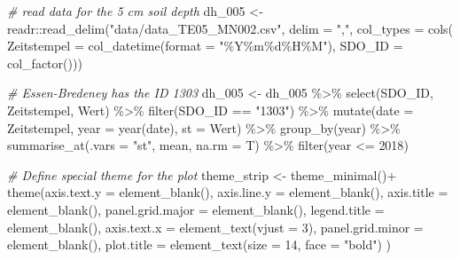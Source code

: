\documentclass[
]{article}
\newenvironment{Shaded}{\begin{snugshade}}{\end{snugshade}}
\newcommand{\AttributeTok}[1]{\textcolor[rgb]{0.77,0.63,0.00}{#1}}
\newcommand{\CommentTok}[1]{\textcolor[rgb]{0.56,0.35,0.01}{\textit{#1}}}
\newcommand{\DecValTok}[1]{\textcolor[rgb]{0.00,0.00,0.81}{#1}}
\newcommand{\FunctionTok}[1]{\textcolor[rgb]{0.00,0.00,0.00}{#1}}
\newcommand{\NormalTok}[1]{#1}
\newcommand{\OtherTok}[1]{\textcolor[rgb]{0.56,0.35,0.01}{#1}}
\newcommand{\SpecialCharTok}[1]{\textcolor[rgb]{0.00,0.00,0.00}{#1}}
\newcommand{\StringTok}[1]{\textcolor[rgb]{0.31,0.60,0.02}{#1}}
\begin{document}
\begin{Shaded}
\begin{Highlighting}[]
\CommentTok{\# read data for the 5 cm soil depth}
\NormalTok{dh\_005 }\OtherTok{\textless{}{-}}\NormalTok{ readr}\SpecialCharTok{::}\FunctionTok{read\_delim}\NormalTok{(}\StringTok{"data/data\_TE05\_MN002.csv"}\NormalTok{,}
                        \AttributeTok{delim =} \StringTok{","}\NormalTok{, }
                        \AttributeTok{col\_types =} \FunctionTok{cols}\NormalTok{(}
                          \AttributeTok{Zeitstempel =} \FunctionTok{col\_datetime}\NormalTok{(}\AttributeTok{format =} \StringTok{"\%Y\%m\%d\%H\%M"}\NormalTok{),}
                          \AttributeTok{SDO\_ID =} \FunctionTok{col\_factor}\NormalTok{()))}

\CommentTok{\# Essen{-}Bredeney has the ID 1303}
\NormalTok{dh\_005 }\OtherTok{\textless{}{-}}\NormalTok{ dh\_005 }\SpecialCharTok{\%\textgreater{}\%}
  \FunctionTok{select}\NormalTok{(SDO\_ID, Zeitstempel, Wert) }\SpecialCharTok{\%\textgreater{}\%}
  \FunctionTok{filter}\NormalTok{(SDO\_ID }\SpecialCharTok{==} \StringTok{"1303"}\NormalTok{) }\SpecialCharTok{\%\textgreater{}\%}
  \FunctionTok{mutate}\NormalTok{(}\AttributeTok{date =}\NormalTok{ Zeitstempel, }
         \AttributeTok{year =} \FunctionTok{year}\NormalTok{(date), }
         \AttributeTok{st =}\NormalTok{ Wert) }\SpecialCharTok{\%\textgreater{}\%}
  \FunctionTok{group\_by}\NormalTok{(year) }\SpecialCharTok{\%\textgreater{}\%}
  \FunctionTok{summarise\_at}\NormalTok{(}\AttributeTok{.vars =} \StringTok{"st"}\NormalTok{, mean, }\AttributeTok{na.rm =}\NormalTok{ T) }\SpecialCharTok{\%\textgreater{}\%}
  \FunctionTok{filter}\NormalTok{(year }\SpecialCharTok{\textless{}=} \DecValTok{2018}\NormalTok{)}

\CommentTok{\# Define special theme for the plot}
\NormalTok{theme\_strip }\OtherTok{\textless{}{-}} \FunctionTok{theme\_minimal}\NormalTok{()}\SpecialCharTok{+}
                 \FunctionTok{theme}\NormalTok{(}\AttributeTok{axis.text.y =} \FunctionTok{element\_blank}\NormalTok{(),}
                       \AttributeTok{axis.line.y =} \FunctionTok{element\_blank}\NormalTok{(),}
                       \AttributeTok{axis.title =} \FunctionTok{element\_blank}\NormalTok{(),}
                       \AttributeTok{panel.grid.major =} \FunctionTok{element\_blank}\NormalTok{(),}
                       \AttributeTok{legend.title =} \FunctionTok{element\_blank}\NormalTok{(),}
                       \AttributeTok{axis.text.x =} \FunctionTok{element\_text}\NormalTok{(}\AttributeTok{vjust =} \DecValTok{3}\NormalTok{),}
                       \AttributeTok{panel.grid.minor =} \FunctionTok{element\_blank}\NormalTok{(),}
                        \AttributeTok{plot.title =} \FunctionTok{element\_text}\NormalTok{(}\AttributeTok{size =} \DecValTok{14}\NormalTok{, }\AttributeTok{face =} \StringTok{"bold"}\NormalTok{)}
\NormalTok{                       )}


\end{Highlighting}
\end{Shaded}
\end{document}

